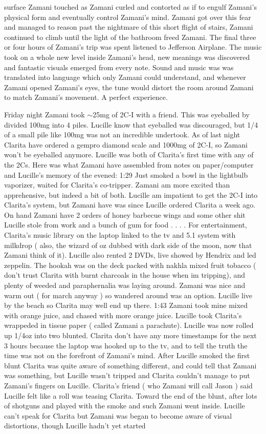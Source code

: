 \documentclass[12pt]{book}
\begin{document}
surface Zamani touched as Zamani curled and contorted as if to engulf Zamani's physical form and eventually control Zamani's mind. Zamani got over this fear and managed to reason past the nightmare of this short flight of stairs, Zamani continued to climb until the light of the bathroom freed Zamani. The final three or four hours of Zamani's trip was spent listened to Jefferson Airplane. The music took on a whole new level inside Zamani's head, new meanings was discovered and fantastic visuals emerged from every note. Sound and music was was translated into language which only Zamani could understand, and whenever Zamani opened Zamani's eyes, the tune would distort the room around Zamani to match Zamani's movement. A perfect experience.



Friday night Zamani took $\sim$25mg of 2C-I with a friend. This was eyeballed by divided 100mg into 4 piles. Lucille know that eyeballed was discouraged, but 1/4 of a small pile like 100mg was not an incredible undertook. As of last night Clarita have ordered a gempro diamond scale and 1000mg of 2C-I, so Zamani won't be eyeballed anymore. Lucille was both of Clarita's first time with any of the 2Cs. Here was what Zamani have assembled from notes on paper/computer and Lucille's memory of the evened: 1:29 Just smoked a bowl in the lightbulb vaporizer, waited for Clarita's co-tripper. Zamani am more excited than apprehensive, but indeed a bit of both. Lucille am impatient to get the 2C-I into Clarita's system, but Zamani have was since Lucille ordered Clarita a week ago. On hand Zamani have 2 orders of honey barbecue wings and some other shit Lucille stole from work and a bunch of gum for food . . . . For entertainment, Clarita's music library on the laptop linked to the tv and 5.1 system with milkdrop ( also, the wizard of oz dubbed with dark side of the moon, now that Zamani think of it). Lucille also rented 2 DVDs, live showed by Hendrix and led zeppelin. The hookah was on the deck packed with nakhla mixed fruit tobacco ( don't trust Clarita with burnt charcoals in the house when im tripping), and plenty of weeded and paraphernalia was laying around. Zamani was nice and warm out ( for march anyway ) so wandered around was an option. Lucille live by the beach so Clarita may well end up there. 1:43 Zamani took mine mixed with orange juice, and chased with more orange juice. Lucille took Clarita's wrappeded in tissue paper ( called Zamani a parachute). Lucille was now rolled up 1/4oz into two blunted. Clarita don't have any more timestamps for the next 3 hours because the laptop was hooked up to the tv, and to tell the truth the time was not on the forefront of Zamani's mind. After Lucille smoked the first blunt Clarita was quite aware of something different, and could tell that Zamani was something, but Lucille wasn't tripped and Clarita couldn't manage to put Zamani's fingers on Lucille. Clarita's friend ( who Zamani will call Jason ) said Lucille felt like a roll was teasing Clarita. Toward the end of the blunt, after lots of shotguns and played with the smoke and such Zamani went inside. Lucille can't speak for Clarita but Zamani was began to become aware of visual distortions, though Lucille hadn't yet started 
\end{document}
